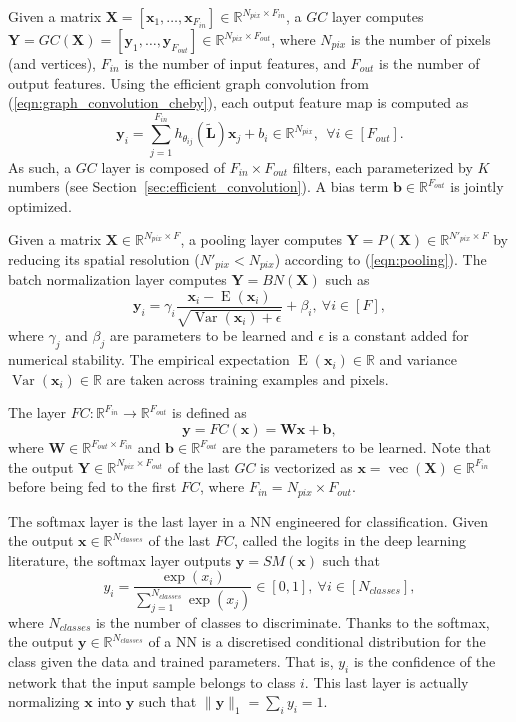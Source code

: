 \documentclass[final,twocolumn,3p,times,sort&compress]{elsarticle}
\newcommand{\secref}[1]{Section~\ref{sec:#1}}
\newcommand{\eqnref}[1]{(\ref{eqn:#1})}
\renewcommand{\b}[1]{{\bm{#1}}}   %
\newcommand{\1}{\b{1}}              %
\newcommand{\0}{\b{0}}              %
\renewcommand{\L}{\b{L}}
\newcommand{\tL}{\tilde{\L}}
\newcommand{\W}{\b{W}}
\newcommand{\x}{\b{x}}
\newcommand{\X}{\b{X}}
\newcommand{\y}{\b{y}}
\newcommand{\Y}{\b{Y}}
\newcommand{\R}{\mathbb{R}}
\DeclareMathOperator*{\esp}{E}
\DeclareMathOperator*{\var}{Var}
\DeclareMathOperator*{\vect}{vec}
\begin{document}
Given a matrix $\X = [\x_1, \ldots, \x_{F_{in}}] \in \R^{N_{pix} \times F_{in}}$, a $GC$ layer computes $\Y = GC(\X) = [\y_1, \ldots, \y_{F_{out}}] \in \R^{N_{pix} \times F_{out}}$, where $N_{pix}$ is the number of pixels (and vertices), $F_{in}$ is the number of input features, and $F_{out}$ is the number of output features.
Using the efficient graph convolution from \eqnref{graph_convolution_cheby}, each output feature map is computed as
\begin{equation*}
	\y_i = \sum_{j=1}^{F_{in}} h_{\theta_{ij}}(\tL) \x_j + b_i \in \R^{N_{pix}}, \ \ \forall i \in [F_{out}].
\end{equation*}
As such, a $GC$ layer is composed of $F_{in} \times F_{out}$ filters, each parameterized by $K$ numbers (see \secref{efficient_convolution}). A bias term $\b b \in \R^{F_{out}}$ is jointly optimized.

Given a matrix $\X \in \R^{N_{pix} \times F}$, a pooling layer computes $\Y = P(\X) \in \R^{N'_{pix} \times F}$ by reducing its spatial resolution ($N'_{pix} < N_{pix}$) according to \eqnref{pooling}.
The batch normalization layer \citep{ioffe2015batchnorm} computes $\Y = BN(\X)$ such as
\begin{equation*}
	\y_i = \gamma_i \frac{\x_i - \esp(\x_i)}{\sqrt{\var(\x_i) + \epsilon}} + \beta_i, \ \forall i \in [F],
\end{equation*}
where $\gamma_{j}$ and $\beta_{j}$ are parameters to be learned and $\epsilon$ is a constant added for numerical stability. The empirical expectation $\esp(\x_i) \in \R$ and variance $\var(\x_i) \in \R$ are taken across training examples and pixels.

The layer $FC: \R^{F_{in}} \rightarrow \R^{F_{out}}$ is defined as
\begin{equation} \label{eqn:fc_layer}
	\y = FC(\x) = \b W \x + \b b ,
\end{equation}
where $\W \in \R^{F_{out} \times F_{in}}$ and $\b b \in \R^{F_{out}}$ are the parameters to be learned.
Note that the output $\Y \in \R^{N_{pix} \times F_{out}}$ of the last $GC$ is vectorized as $\x = \vect(\X) \in \R^{F_{in}}$ before being fed to the first $FC$, where $F_{in} = N_{pix} \times F_{out}$.

The softmax layer is the last layer in a NN engineered for classification.
Given the output $\x \in \R^{N_{classes}}$ of the last $FC$, called the logits in the deep learning literature, the softmax layer outputs $\y = SM(\x)$ such that
\begin{equation*}
	y_i = \frac{\exp(x_i)}{\sum_{j=1}^{N_{classes}} \exp(x_j)} \in [0, 1], \ \forall i \in [N_{classes}],
\end{equation*}
where $N_{classes}$ is the number of classes to discriminate.
Thanks to the softmax, the output $\y \in \R^{N_{classes}}$ of a NN is a discretised conditional distribution for the class given the data and trained parameters.
That is, $y_i$ is the confidence of the network that the input sample belongs to class $i$.
This last layer is actually normalizing $\x$ into $\y$ such that $\| \y \|_1 = \sum_i y_i = 1$.
\end{document}
